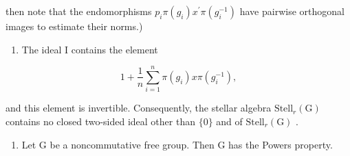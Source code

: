 then note that the endomorphisms \(p_{i}\pi(g_{i})x^{\prime}\pi(g_{i}^{-1})\) have pairwise orthogonal images to estimate their norms.)

\begin{enumerate}
\def\labelenumi{\alph{enumi})}
\setcounter{enumi}{3}
\tightlist
\item
  The ideal I contains the element
\end{enumerate}

\[
1 + \frac {1}{n} \sum_ {i = 1} ^ {n} \pi (g _ {i}) x \pi (g _ {i} ^ {- 1}),
\]

and this element is invertible. Consequently, the stellar algebra \(\text{Stell}_{r}(\text{G})\) contains no closed two-sided ideal other than \(\{0\}\) and of \(\text{Stell}_{r}(\text{G})\) .

\begin{enumerate}
\def\labelenumi{\alph{enumi})}
\setcounter{enumi}{4}
\tightlist
\item
  Let G be a noncommutative free group. Then G has the Powers property.
\end{enumerate}
\relax{}

